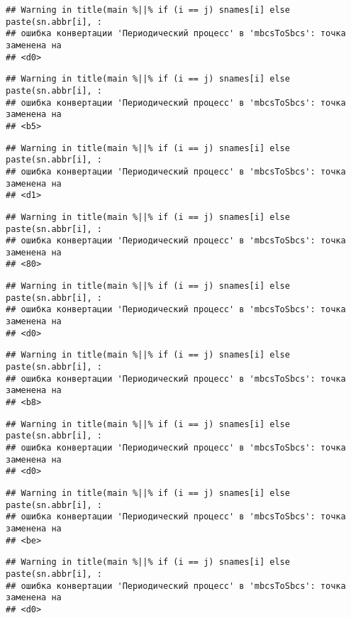\documentclass[
]{article}
\begin{document}
\begin{verbatim}
## Warning in title(main %||% if (i == j) snames[i] else paste(sn.abbr[i], :
## ошибка конвертации 'Периодический процесс' в 'mbcsToSbcs': точка заменена на
## <d0>
\end{verbatim}

\begin{verbatim}
## Warning in title(main %||% if (i == j) snames[i] else paste(sn.abbr[i], :
## ошибка конвертации 'Периодический процесс' в 'mbcsToSbcs': точка заменена на
## <b5>
\end{verbatim}

\begin{verbatim}
## Warning in title(main %||% if (i == j) snames[i] else paste(sn.abbr[i], :
## ошибка конвертации 'Периодический процесс' в 'mbcsToSbcs': точка заменена на
## <d1>
\end{verbatim}

\begin{verbatim}
## Warning in title(main %||% if (i == j) snames[i] else paste(sn.abbr[i], :
## ошибка конвертации 'Периодический процесс' в 'mbcsToSbcs': точка заменена на
## <80>
\end{verbatim}

\begin{verbatim}
## Warning in title(main %||% if (i == j) snames[i] else paste(sn.abbr[i], :
## ошибка конвертации 'Периодический процесс' в 'mbcsToSbcs': точка заменена на
## <d0>
\end{verbatim}

\begin{verbatim}
## Warning in title(main %||% if (i == j) snames[i] else paste(sn.abbr[i], :
## ошибка конвертации 'Периодический процесс' в 'mbcsToSbcs': точка заменена на
## <b8>
\end{verbatim}

\begin{verbatim}
## Warning in title(main %||% if (i == j) snames[i] else paste(sn.abbr[i], :
## ошибка конвертации 'Периодический процесс' в 'mbcsToSbcs': точка заменена на
## <d0>
\end{verbatim}

\begin{verbatim}
## Warning in title(main %||% if (i == j) snames[i] else paste(sn.abbr[i], :
## ошибка конвертации 'Периодический процесс' в 'mbcsToSbcs': точка заменена на
## <be>
\end{verbatim}

\begin{verbatim}
## Warning in title(main %||% if (i == j) snames[i] else paste(sn.abbr[i], :
## ошибка конвертации 'Периодический процесс' в 'mbcsToSbcs': точка заменена на
## <d0>
\end{verbatim}
\end{document}
